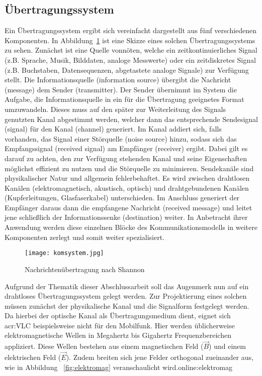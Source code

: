 \subsection{Übertragungssystem}
\label{subsec:aufbauueber}

Ein Übertragungssystem ergibt sich vereinfacht dargestellt aus fünf verschiedenen Komponenten. In Abbildung~\ref{fig:komsystem} ist eine Skizze eines solchen Übertragungssystems zu sehen. Zunächst ist eine Quelle vonnöten, welche ein zeitkontinuierliches Signal (z.B. Sprache, Musik, Bilddaten, analoge Messwerte) oder ein zeitdiskretes Signal (z.B. Buchstaben, Datensequenzen, abgetastete analoge Signale) zur Verfügung stellt. Die Informationsquelle (information source) übergibt die Nachricht (message) dem Sender (transmitter). Der Sender übernimmt im System die Aufgabe, die Informationsquelle in ein für die Übertragung geeignetes Format umzuwandeln. Dieses muss auf den später zur Weiterleitung des Signals genutzten Kanal abgestimmt werden, welcher dann das entsprechende Sendesignal (signal) für den Kanal (channel) generiert. Im Kanal addiert sich, falls vorhanden, das Signal einer Störquelle (noise source) hinzu, sodass sich das Empfangssignal (received signal) am Empfänger (receiver) ergibt. Dabei gilt es darauf zu achten, den zur Verfügung stehenden Kanal und seine Eigenschaften möglichst effizient zu nutzen und die Störquelle zu minimieren. Sendekanäle sind physikalischer Natur und allgemein fehlerbehaftet. Es wird zwischen drahtlosen Kanälen (elektromagnetisch, akustisch, optisch) und drahtgebundenen Kanälen (Kupferleitungen, Glasfaserkabel) unterschieden. Im Anschluss generiert der Empfänger daraus dann die empfangene Nachricht (received message) und leitet jene schließlich der Informationssenke (destination) weiter. In Anbetracht ihrer Anwendung werden diese einzelnen Blöcke des Kommunikationsmodells in weitere Komponenten zerlegt und somit weiter spezialisiert.\cite{NT}

\begin{figure}[H]
	\centering
	\texttt{[image: komsystem.jpg]}
	\caption[Nachrichtenübertragung nach Shannon]{Nachrichtenübertragung nach Shannon} 
	\cite{shannon}
	\label{fig:komsystem}
\end{figure}

Aufgrund der Thematik dieser Abschlussarbeit soll das Augenmerk nun auf ein drahtloses Übertragungssystem gelegt werden. Zur Projektierung eines solchen müssen zunächst der physikalische Kanal und die Signalform festgelegt werden. Da hierbei der optische Kanal als Übertragungsmedium dient, eignet sich \gls{acr:VLC} beispielsweise nicht für den Mobilfunk. Hier werden üblicherweise elektromagnetische Wellen in Megahertz bis Gigahertz Frequenzbereichen appliziert. Diese Wellen bestehen aus einem magnetischen Feld ($\vec{B}$) und einem elektrischen Feld ($\vec{E}$). Zudem breiten sich jene Felder orthogonal zueinander aus, wie in Abbildung ~\ref{fig:elektromag} veranschaulicht wird.\gls{online:elektromag} 


